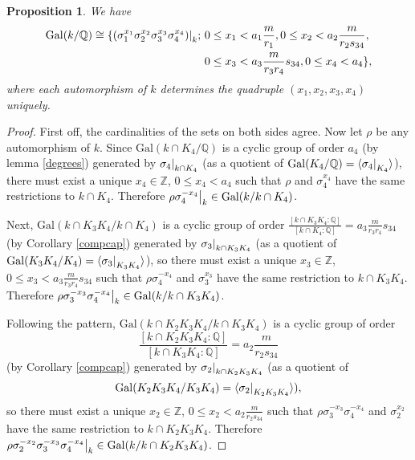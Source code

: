 \documentclass[12pt,a4paper]{article}
\newtheorem{prop}[theorem]{Proposition}
\newcommand{\Qbb}{\mathbb{Q}}
\newcommand{\Q}{\mathbb{Q}}
\newcommand{\Z}{\mathbb{Z}}
\newcommand{\Gal}{\mathrm{Gal}}
\newcommand\restr[2]{{%
  \left.\kern-\nulldelimiterspace %
  #1 %
  \right|_{#2} %
  }}
\begin{document}
\begin{prop}\label{gal}
We have 
\begin{equation*}
\begin{split}
\Gal(k/\Qbb)\cong
 \{\restr{\left(\sigma_1^{x_1}\sigma_2^{x_2}\sigma_3^{x_3}\sigma_4^{x_4}\right)}{k};~ & 0\leq x_1<a_1\frac{m}{r_1}, 0\leq x_2<a_2\frac{m}{r_2s_{34}}, \\ & 0\leq x_3<a_3\frac{m}{r_3r_4}s_{34},0\leq x_4<a_4\},
\end{split}
\end{equation*}
where each automorphism of $k$ determines the quadruple $(x_1,x_2,x_3,x_4)$ uniquely.
\end{prop}
\begin{proof}
First off, the cardinalities of the sets on both sides agree. Now let $\rho$ be any automorphism of $k$. Since $\Gal(k\cap K_4/\Q)$ is a cyclic group of order $a_4$ (by lemma \ref{degrees}) generated by $\restr{\sigma_4}{k\cap K_4}$ (as a quotient of $\Gal(K_4/\Q)=\langle \restr{\sigma_4}{K_4}\rangle$), there must exist a unique $x_4\in \Z$, $0\leq x_4<a_4$ such that $\rho$ and $\sigma_4^{x_4}$ have the same restrictions to $k\cap K_4$. Therefore $\rho\restr{\sigma_4^{-x_4}}{k}\in \Gal(k/k\cap K_4)$. 

Next, $\Gal(k\cap K_3K_4/k\cap K_4)$ is a cyclic group of order $\frac{[k\cap K_3K_4:\Q]}{[k\cap K_4:\Q]}=a_3\frac{m}{r_3r_4}s_{34}$ (by Corollary \ref{compcap}) generated by $\restr{\sigma_3}{k\cap K_3K_4}$ (as a quotient of $\Gal(K_3K_4/K_4)=\langle \restr{\sigma_3}{K_3K_4}\rangle$), so there must exist a unique $x_3\in \Z$, $0\leq x_3<a_3\frac{m}{r_3r_4}s_{34}$ such that $\rho\sigma_4^{-x_4}$ and $\sigma_3^{x_3}$ have the same restriction to $k\cap K_3K_4$. Therefore $\restr{\rho\sigma_3^{-x_3}\sigma_4^{-x_4}}{k}\in \Gal(k/k\cap K_3K_4)$.

Following the pattern, $\Gal(k\cap K_2K_3K_4/k\cap K_3K_4)$ is a cyclic group of order 
$$\frac{[k\cap K_2K_3K_4:\Q]}{[k\cap K_3K_4:\Q]}=a_2\frac{m}{r_2s_{34}}$$ (by Corollary \ref{compcap}) generated by $\restr{\sigma_2}{k\cap K_2K_3K_4}$ (as a quotient of $$\Gal(K_2K_3K_4/K_3K_4)=\langle \restr{\sigma_2}{K_2K_3K_4}\rangle),$$ so there must exist a unique $x_2\in \Z$, $0\leq x_2<a_2\frac{m}{r_2s_{34}}$ such that $\rho\sigma_3^{-x_3}\sigma_4^{-x_4}$ and $\sigma_2^{x_2}$ have the same restriction to $k\cap K_2K_3K_4$. Therefore $\restr{\rho\sigma_2^{-x_2}\sigma_3^{-x_3}\sigma_4^{-x_4}}{k}\in \Gal(k/k\cap K_2K_3K_4)$.


\end{proof}
\end{document}
